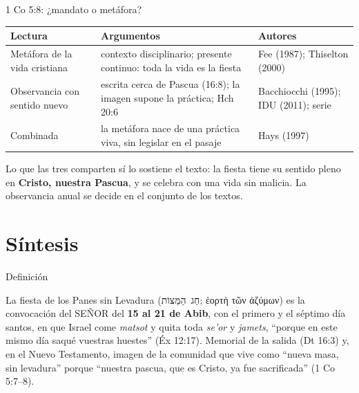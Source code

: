 \documentclass[hyperref={bookmarks=false},aspectratio=169]{beamer}
\newcommand{\heb}[1]{\mbox{\foreignlanguage{hebrew}{#1}}}
\newcommand{\grc}[1]{\foreignlanguage{ancientgreek}{#1}}
\newcommand{\SENOR}{S{\fontsize{0.78em}{1em}\selectfont EÑOR}}
\newcommand{\destacar}[1]{\textbf{\textcolor{tierraroja}{#1}}}
\begin{document}
\begin{frame}{1 Co 5:8: ¿mandato o metáfora?}
\scriptsize\renewcommand{\arraystretch}{1.15}
\begin{tabular}{@{}L{2.6cm}L{6.0cm}L{3.4cm}@{}}
\toprule
\textbf{Lectura} & \textbf{Argumentos} & \textbf{Autores} \\ \midrule
Metáfora de la vida cristiana & contexto disciplinario; presente continuo: toda la vida es la fiesta & Fee (1987); Thiselton (2000) \\
Observancia con sentido nuevo & escrita cerca de Pascua (16:8); la imagen supone la práctica; Hch 20:6 & Bacchiocchi (1995); IDU (2011); serie \\
Combinada & la metáfora nace de una práctica viva, sin legislar en el pasaje & Hays (1997) \\
\bottomrule
\end{tabular}\par\medskip
\small Lo que las tres comparten sí lo sostiene el texto: la fiesta tiene su sentido pleno en \destacar{Cristo, nuestra Pascua}, y se celebra con una vida sin malicia. La observancia anual se decide en el conjunto de los textos.
\end{frame}


\section{Síntesis}

\begin{frame}{Definición}
\begin{tcolorbox}[colback=papiro,colframe=tierraroja,boxrule=1pt,arc=3pt]
\small La fiesta de los Panes sin Levadura (\heb{חַג הַמַּצּוֹת}; \grc{ἑορτὴ τῶν ἀζύμων}) es la convocación del \SENOR{} del \destacar{15 al 21 de Abib}, con el primero y el séptimo día santos, en que Israel come \emph{matsot} y quita toda \emph{se'or} y \emph{jamets}, ``porque en este mismo día saqué vuestras huestes'' (Éx 12:17). Memorial de la salida (Dt 16:3) y, en el Nuevo Testamento, imagen de la comunidad que vive como ``nueva masa, sin levadura'' porque ``nuestra pascua, que es Cristo, ya fue sacrificada'' (1 Co 5:7--8).
\end{tcolorbox}
\end{frame}
\end{document}
